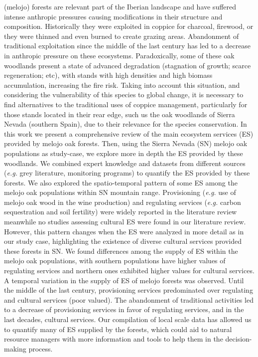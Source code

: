 \Qpy (melojo) forests are relevant part of the Iberian landscape and have suffered intense anthropic pressures causing modifications in their structure and composition. Historically they were exploited in coppice for charcoal, firewood, or they were thinned and even burned to create grazing areas. Abandonment of traditional exploitation since the middle of the last century has led to a decrease in anthropic pressure on these ecosystems. Paradoxically, some of these oak woodlands present a state of advanced degradation (stagnation of growth; scarce regeneration; etc), with stands with high densities and high biomass accumulation, increasing the fire risk. Taking into account this situation, and considering the vulnerability of this species to global change, it is necessary to find alternatives to the traditional uses of coppice management, particularly for those stands located in their rear edge, such us the oak woodlands of Sierra Nevada (southern Spain), due to their relevance for the species conservation. In this work we present a comprehensive review of the main ecosystem services (ES) provided by melojo oak forests. Then, using the Sierra Nevada (SN) melojo oak populations as study-case, we explore more in depth the ES provided by these woodlands. We combined expert knowledge and datasets from different sources (\emph{e.g.} grey literature, monitoring programs) to quantify the ES provided by these forests. We also explored the spatio-temporal pattern of some ES among the melojo oak populations within SN mountain range. Provisioning (\emph{e.g.} use of melojo oak wood in the wine production) and regulating services (\emph{e.g.} carbon sequestration and soil fertility) were widely reported in the literature review meanwhile no studies assessing cultural ES were found in our literature review. However, this pattern changes when the ES were analyzed in more detail as in our study case, highlighting the existence of diverse cultural services provided these forests in SN. We found differences among the supply of ES within the melojo oak populations, with southern populations have higher values of regulating services and northern ones exhibited higher values for cultural services. A temporal variation in the supply of ES of melojo forests was observed. Until the middle of the last century, provisioning services predominated over regulating and cultural services (poor valued). The abandonment of traditional activities led to a decrease of provisioning services in favor of regulating services, and in the last decades, cultural services. Our compilation of local scale data has allowed us to quantify many of ES supplied by the \Qp forests, which could aid to natural resource managers with more information and tools to help them in the decision-making process.
\newpage

